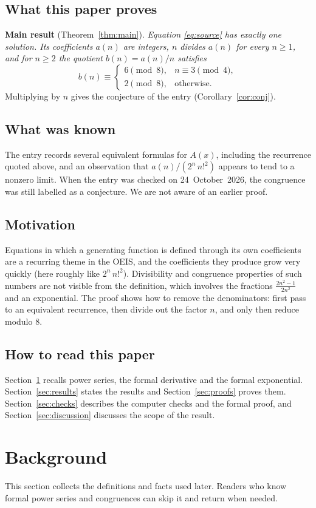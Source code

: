 \documentclass[11pt,a4paper]{article}
\theoremstyle{definition}
\theoremstyle{remark}
\begin{document}
\subsection{What this paper proves}
\textbf{Main result} (Theorem~\ref{thm:main}). \emph{Equation \eqref{eq:source} has exactly one solution. Its
coefficients $a(n)$ are integers, $n$ divides $a(n)$ for every $n\ge1$, and for $n\ge2$ the quotient $b(n)=a(n)/n$
satisfies}
\[
b(n)\equiv\begin{cases}6\pmod8,&n\equiv3\pmod4,\\2\pmod8,&\text{otherwise}.\end{cases}
\]
Multiplying by $n$ gives the conjecture of the entry (Corollary~\ref{cor:conj}).

\subsection{What was known}
The entry records several equivalent formulas for $A(x)$, including the recurrence quoted above, and an observation that
$a(n)/(2^n\,n!^2)$ appears to tend to a nonzero limit. When the entry was checked on 24~October~2026, the congruence was
still labelled as a conjecture. We are not aware of an earlier proof.

\subsection{Motivation}
Equations in which a generating function is defined through its own coefficients are a recurring theme in the OEIS, and
the coefficients they produce grow very quickly (here roughly like $2^n\,n!^2$). Divisibility and congruence properties
of such numbers are not visible from the definition, which involves the fractions $\frac{2n^2-1}{2n^2}$ and an
exponential. The proof shows how to remove the denominators: first pass to an equivalent recurrence, then divide out the
factor $n$, and only then reduce modulo $8$.

\subsection{How to read this paper}
Section~\ref{sec:background} recalls power series, the formal derivative and the formal exponential.
Section~\ref{sec:results} states the results and Section~\ref{sec:proofs} proves them. Section~\ref{sec:checks}
describes the computer checks and the formal proof, and Section~\ref{sec:discussion} discusses the scope of the
result.
\section{Background}\label{sec:background}
This section collects the definitions and facts used later. Readers who know formal power series and congruences can skip it and return when needed.
\end{document}
